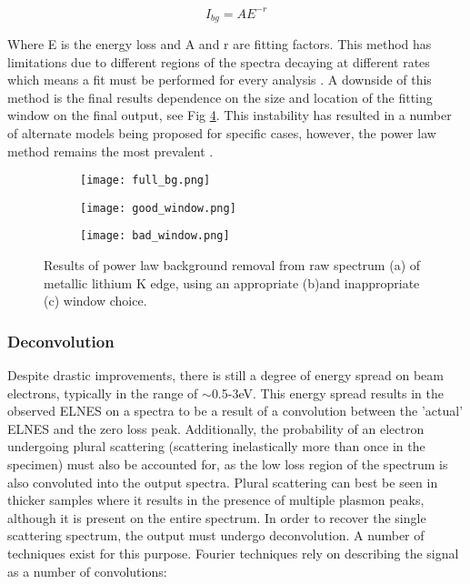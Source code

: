 \begin{equation}
	I_{bg} = AE^{-r}
\end{equation}

Where E is the energy loss and A and r are fitting factors.  This method has limitations due to different regions of the spectra decaying at different rates which means a fit must be performed for every analysis \cite{verbeeck_model_2004, egerton_inelastic_1975}.  A downside of this method is the final results dependence on the size and location of the fitting window on the final output, see Fig \ref{bg_removal}.  This instability has resulted in a number of alternate models being proposed for specific cases, however, the power law method remains the most prevalent \cite{verbeeck_model_2004, riedl_extraction_2006}.  

\begin{figure}
	\centering
	\begin{subfigure}{0.45\textwidth}
		\texttt{[image: full\_bg.png]} 
		\caption{}
		\label{full_bg}
	\end{subfigure}
	\hfill
	
	\begin{subfigure}{0.45\textwidth}
		\texttt{[image: good\_window.png]} 
		\caption{}
		\label{good_window}
	\end{subfigure}
	\begin{subfigure}{0.45\textwidth}
		\texttt{[image: bad\_window.png]} 
		\caption{}
		\label{bad_window}
	\end{subfigure}
	\caption{Results of power law background removal from raw spectrum (a) of metallic lithium K edge, using an appropriate (b)and inappropriate (c) window choice.}
	\label{bg_removal}
\end{figure}

\subsubsection{Deconvolution} \label{deconvolution}
Despite drastic improvements, there is still a degree of energy spread on beam electrons, typically in the range of $\sim$0.5-3eV.  This energy spread results in the observed ELNES on a spectra to be a result of a convolution between the 'actual' ELNES and the zero loss peak.  Additionally, the probability of an electron undergoing plural scattering (scattering inelastically more than once in the specimen) must also be accounted for, as the low loss region of the spectrum is also convoluted into the output spectra.  Plural scattering can best be seen in thicker samples where it results in the presence of multiple plasmon peaks, although it is present on the entire spectrum.  In order to recover the single scattering spectrum, the output must undergo deconvolution.  A number of techniques exist for this purpose.   Fourier techniques rely on describing the signal as a number of convolutions:

